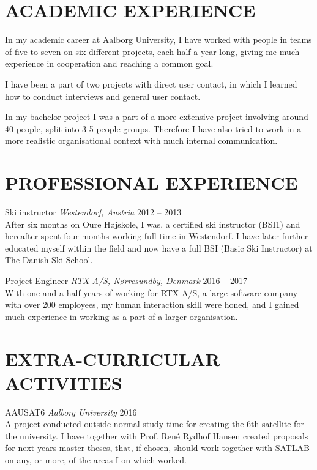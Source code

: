\documentclass[margin, 10pt]{res} %
\begin{document}
\begin{resume}
\section{ACADEMIC EXPERIENCE}

In my academic career at Aalborg University, I have worked with people in teams of five to seven on six different projects, each half a year long, giving me much experience in cooperation and reaching a common goal.

I have been a part of two projects with direct user contact, in which I learned how to conduct interviews and general user contact.

In my bachelor project I was a part of a more extensive project involving around 40 people, split into 3-5 people groups. Therefore I have also tried to work in a more realistic organisational context with much internal communication. 

\section{PROFESSIONAL EXPERIENCE}

Ski instructor {\it Westendorf, Austria} \hfill 2012 -- 2013 \\
After six months on Oure Højskole, I was, a certified ski instructor (BSI1) and hereafter spent four months working full time in Westendorf. I have later further educated myself within the field and now have a full BSI (Basic Ski Instructor) at The Danish Ski School.

Project Engineer {\it RTX A/S, Nørresundby, Denmark} \hfill 2016 -- 2017 \\
With one and a half years of working for RTX A/S, a large software company with over 200 employees, my human interaction skill were honed, and I gained much experience in working as a part of a larger organisation.


\section{EXTRA-CURRICULAR ACTIVITIES} 

AAUSAT6 {\it Aalborg University} \hfill 2016 \\ 
A project conducted outside normal study time for creating the 6th satellite for the university.
I have together with Prof. René Rydhof Hansen created proposals for next years master theses, that, if chosen, should work together with SATLAB on any, or more, of the areas I on which worked.


\end{resume}
\end{document}
